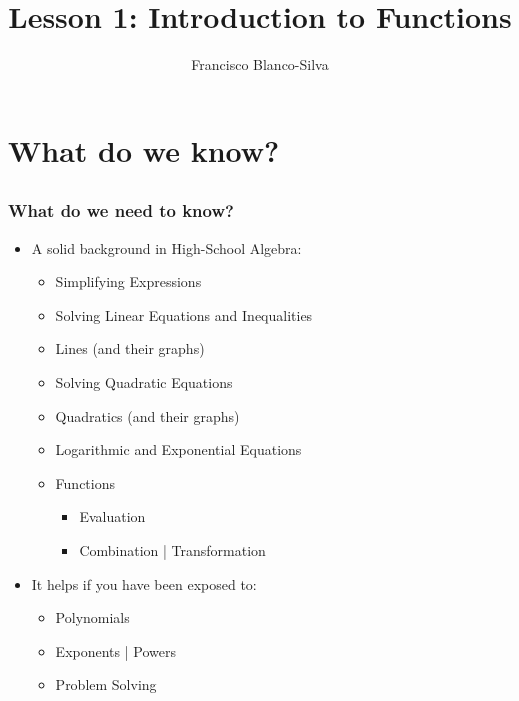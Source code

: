 \documentclass[9pt,xcolor=x11names,compress]{beamer}
\title{Lesson 1: Introduction to Functions}
\author[Francisco Blanco-Silva]{Francisco Blanco-Silva}
\institute[USC]{University of South Carolina}
\date{
\pgfdeclarelindenmayersystem{testrhombus}{
	\rule{F -> F+FF++FF+F+++F++F+++F}
}
\begin{tikzpicture}[color=DeepSkyBlue4]
    \draw [l-system={testrhombus, axiom=F+FF++FF+F+++F++F+++F, order=3, step=1.5pt, angle=90}]
    lindenmayer system; 
	\end{tikzpicture}	
}
\begin{document}
\frame{\titlepage}

\section{What do we know?}
\subsection{}

\begin{frame}\frametitle{What do we \alert{need to} know?}
    
\begin{itemize}
\item A solid background in High-School Algebra:
\begin{itemize}
	\item Simplifying Expressions
	\item Solving Linear Equations \alert{and Inequalities}
	\item Lines (and their graphs)
	\item Solving Quadratic Equations
	\item Quadratics (and their graphs)
	\item \alert{Logarithmic and Exponential Equations}
	\item Functions
	\begin{itemize}
		\item Evaluation
		\item Combination | Transformation
	\end{itemize}
\end{itemize}
\item It helps if you have been exposed to:
\begin{itemize}
	\item Polynomials
	\item Exponents | Powers
	\item \alert{Problem Solving}
\end{itemize}
\end{itemize}
\end{frame}
\end{document}
